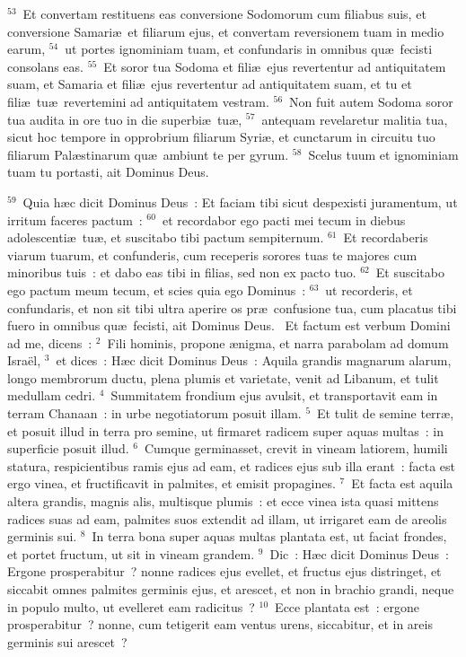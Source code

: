 ${}^{53}$~Et convertam restituens eas conversione Sodomorum cum filiabus suis, et conversione Samari\ae\ et filiarum ejus, et convertam reversionem tuam in medio earum,
${}^{54}$~ut portes ignominiam tuam, et confundaris in omnibus qu\ae\ fecisti consolans eas.
${}^{55}$~Et soror tua Sodoma et fili\ae\ ejus revertentur ad antiquitatem suam, et Samaria et fili\ae\ ejus revertentur ad antiquitatem suam, et tu et fili\ae\ tu\ae\ revertemini ad antiquitatem vestram.
${}^{56}$~Non fuit autem Sodoma soror tua audita in ore tuo in die superbi\ae\ tu\ae ,
${}^{57}$~antequam revelaretur malitia tua, sicut hoc tempore in opprobrium filiarum Syri\ae , et cunctarum in circuitu tuo filiarum Pal\ae stinarum qu\ae\ ambiunt te per gyrum.
${}^{58}$~Scelus tuum et ignominiam tuam tu portasti, ait Dominus Deus.


${}^{59}$~Quia h\ae c dicit Dominus Deus~: Et faciam tibi sicut despexisti juramentum, ut irritum faceres pactum~:
${}^{60}$~et recordabor ego pacti mei tecum in diebus adolescenti\ae\ tu\ae , et suscitabo tibi pactum sempiternum.
${}^{61}$~Et recordaberis viarum tuarum, et confunderis, cum receperis sorores tuas te majores cum minoribus tuis~: et dabo eas tibi in filias, sed non ex pacto tuo.
${}^{62}$~Et suscitabo ego pactum meum tecum, et scies quia ego Dominus~:
${}^{63}$~ut recorderis, et confundaris, et non sit tibi ultra aperire os pr\ae\ confusione tua, cum placatus tibi fuero in omnibus qu\ae\ fecisti, ait Dominus Deus.
~Et factum est verbum Domini ad me, dicens~:
${}^{2}$~Fili hominis, propone \ae nigma, et narra parabolam ad domum Isra\"el,
${}^{3}$~et dices~: H\ae c dicit Dominus Deus~: Aquila grandis magnarum alarum, longo membrorum ductu, plena plumis et varietate, venit ad Libanum, et tulit medullam cedri.
${}^{4}$~Summitatem frondium ejus avulsit, et transportavit eam in terram Chanaan~: in urbe negotiatorum posuit illam.
${}^{5}$~Et tulit de semine terr\ae , et posuit illud in terra pro semine, ut firmaret radicem super aquas multas~: in superficie posuit illud.
${}^{6}$~Cumque germinasset, crevit in vineam latiorem, humili statura, respicientibus ramis ejus ad eam, et radices ejus sub illa erant~: facta est ergo vinea, et fructificavit in palmites, et emisit propagines.
${}^{7}$~Et facta est aquila altera grandis, magnis alis, multisque plumis~: et ecce vinea ista quasi mittens radices suas ad eam, palmites suos extendit ad illam, ut irrigaret eam de areolis germinis sui.
${}^{8}$~In terra bona super aquas multas plantata est, ut faciat frondes, et portet fructum, ut sit in vineam grandem.
${}^{9}$~Dic~: H\ae c dicit Dominus Deus~: Ergone prosperabitur~? nonne radices ejus evellet, et fructus ejus distringet, et siccabit omnes palmites germinis ejus, et arescet, et non in brachio grandi, neque in populo multo, ut evelleret eam radicitus~?
${}^{10}$~Ecce plantata est~: ergone prosperabitur~? nonne, cum tetigerit eam ventus urens, siccabitur, et in areis germinis sui arescet~?


